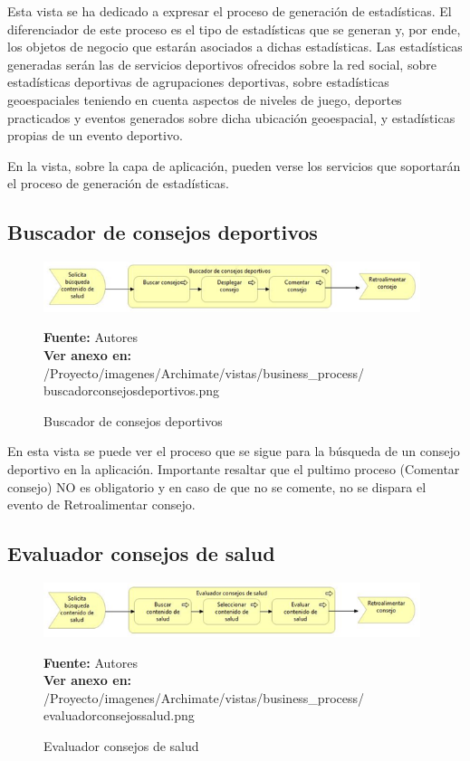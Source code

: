 Esta vista se ha dedicado a expresar el proceso de generación de estadísticas. El diferenciador de este proceso es el tipo de estadísticas que se generan y, por ende, los objetos de negocio que estarán asociados a dichas estadísticas. Las estadísticas generadas serán las de servicios deportivos ofrecidos sobre la red social, sobre estadísticas deportivas de agrupaciones deportivas, sobre estadísticas geoespaciales teniendo en cuenta aspectos de niveles de juego, deportes practicados y eventos generados sobre dicha ubicación geoespacial, y estadísticas propias de un evento deportivo.

En la vista, sobre la capa de aplicación, pueden verse los servicios que soportarán el proceso de generación de estadísticas.

\subsection{Buscador de consejos deportivos}

\begin{figure}[!htb]
  \begin{center}
    \includegraphics[width=11cm]{./imagenes/Archimate/vistas/business_process/buscadorconsejosdeportivos.png}
    \caption{Buscador de consejos deportivos}
    \label{fig:BP_BuscadorConsejosDeportivos}
    \textbf{Fuente:}  Autores \\
     \textbf{Ver anexo en:} /Proyecto/imagenes/Archimate/vistas/business\_process/
     buscadorconsejosdeportivos.png
  \end{center}
\end{figure}

En esta vista se puede ver el proceso que se sigue para la búsqueda de un consejo deportivo en la aplicación. Importante resaltar que el pultimo proceso (Comentar consejo) NO es obligatorio y en caso de que no se comente, no se dispara el evento de Retroalimentar consejo.

\subsection{Evaluador consejos de salud}

\begin{figure}[!htb]
  \begin{center}
    \includegraphics[width=11cm]{./imagenes/Archimate/vistas/business_process/evaluadorconsejossalud.png}
    \caption{Evaluador consejos de salud}
    \label{fig:BP_EvaluadorConsejosSalud}
    \textbf{Fuente:}  Autores \\
     \textbf{Ver anexo en:} /Proyecto/imagenes/Archimate/vistas/business\_process/
     evaluadorconsejossalud.png
  \end{center}
\end{figure}


